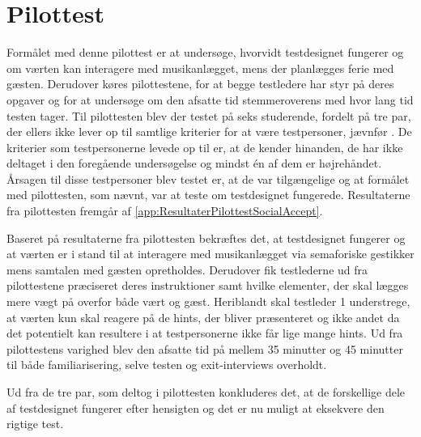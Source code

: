 \section{Pilottest}
\label{PilottestSocialAccept}
%
Formålet med denne pilottest er at undersøge, hvorvidt testdesignet fungerer og om værten kan interagere med musikanlægget, mens der planlægges ferie med gæsten. Derudover køres pilottestene, for at begge testledere har styr på deres opgaver og for at undersøge om den afsatte tid stemmeroverens med hvor lang tid testen tager. \blankline
%
Til pilottesten blev der testet på seks studerende, fordelt på tre par, der ellers ikke lever op til samtlige kriterier for at være testpersoner, jævnfør . De kriterier som testpersonerne levede op til er, at de kender hinanden, de har ikke deltaget i den foregående undersøgelse og mindst én af dem er højrehåndet. Årsagen til disse testpersoner blev testet er, at de var tilgængelige og at formålet med pilottesten, som nævnt, var at teste om testdesignet fungerede. Resultaterne fra pilottesten fremgår af \autoref{app:ResultaterPilottestSocialAccept}. 

Baseret på resultaterne fra pilottesten bekræftes det, at testdesignet fungerer og at værten er i stand til at interagere med musikanlægget via semaforiske gestikker mens samtalen med gæsten opretholdes. Derudover fik testlederne ud fra pilottestene præciseret deres instruktioner samt hvilke elementer, der skal lægges mere vægt på overfor både vært og gæst. Heriblandt skal testleder 1 understrege, at værten kun skal reagere på de hints, der bliver præsenteret og ikke andet da det potentielt kan resultere i at testpersonerne ikke får lige mange hints. Ud fra pilottestens varighed blev den afsatte tid på mellem 35 minutter og 45 minutter til både familiarisering, selve testen og exit-interviews overholdt.

Ud fra de tre par, som deltog i pilottesten konkluderes det, at de forskellige dele af testdesignet fungerer efter hensigten og det er nu muligt at eksekvere den rigtige test. 

